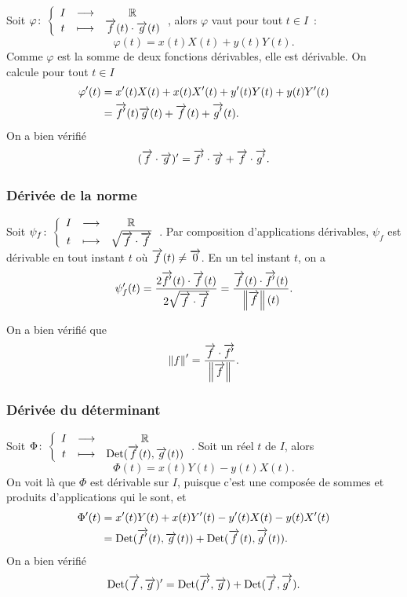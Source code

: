 Soit \(\varphi\colon\left\{\begin{array}{ccc}I & \longrightarrow &\mathbb{R}\\t & \longmapsto & \overrightarrow{f}(t) \cdot \overrightarrow{g}(t)\end{array}\right.\), alors
\(\varphi\) vaut pour tout \(t \in I\)~:
\begin{equation}
  \varphi(t)=x(t)X(t)+y(t)Y(t).
\end{equation}
Comme \(\varphi\) est la somme de deux fonctions dérivables, elle est dérivable.
On calcule pour tout \(t \in I\)
\begin{align}
  \varphi'(t)&=x'(t)X(t) + x(t)X'(t) + y'(t)Y(t) + y(t)Y'(t)\\
             &=\overrightarrow{f'}(t)\overrightarrow{g}(t)+ \overrightarrow{f}(t) + \overrightarrow{g'}(t).
\end{align}
On a bien vérifié
\begin{equation}
  (\overrightarrow{f} \cdot \overrightarrow{g})'=\overrightarrow{f'} \cdot \overrightarrow{g} + \overrightarrow{f} \cdot
  \overrightarrow{g'}.
\end{equation}

\subsubsection{Dérivée de la norme}

Soit \(\psi_f\colon\left\{\begin{array}{ccc}I & \longrightarrow &\mathbb{R}\\t & \longmapsto & \sqrt{\overrightarrow{f} \cdot \overrightarrow{f}}\end{array}\right.\). Par
composition d'applications dérivables, \(\psi_f\) est dérivable en tout instant
\(t\) où \(\overrightarrow{f}(t) \neq \overrightarrow{0}\). En un tel instant \(t\), on a
\begin{equation}
  \psi_f'(t)=\frac{2 \overrightarrow{f'}(t)\cdot\overrightarrow{f}(t)}{2 \sqrt{\overrightarrow{f} \cdot
  \overrightarrow{f}}}=\frac{\overrightarrow{f}(t)\cdot\overrightarrow{f'}(t)}{\left\lVert\overrightarrow{f}\right\rVert(t)}.
\end{equation}

On a bien vérifié que
\begin{equation}
  \left\lVert f\right\rVert'=\frac{\overrightarrow{f} \cdot \overrightarrow{f'}}{\left\lVert\overrightarrow{f}\right\rVert}.
\end{equation}

\subsubsection{Dérivée du déterminant}

Soit \(\Phi\colon\left\{\begin{array}{ccc}I & \longrightarrow &\mathbb{R}\\t & \longmapsto & \operatorname{Det}(\overrightarrow{f}(t),\overrightarrow{g}(t))\end{array}\right.\). Soit un réel
\(t\) de \(I\), alors
\begin{equation}
  \Phi(t) = x(t)Y(t) - y(t)X(t).
\end{equation}
On voit là que \(\Phi\) est dérivable sur \(I\), puisque c'est une composée de
sommes et produits d'applications qui le sont, et
\begin{align}
  \Phi'(t)&=x'(t)Y(t) + x(t)Y'(t) - y'(t)X(t) - y(t)X'(t)\\
          &= \operatorname{Det}(\overrightarrow{f'}(t),\overrightarrow{g}(t)) + \operatorname{Det}(\overrightarrow{f}(t),\overrightarrow{g'}(t)).
\end{align}
On a bien vérifié
\begin{equation}
  \operatorname{Det}(\overrightarrow{f},\overrightarrow{g})' = \operatorname{Det}(\overrightarrow{f'},\overrightarrow{g}) +
  \operatorname{Det}(\overrightarrow{f},\overrightarrow{g'}).
\end{equation}

